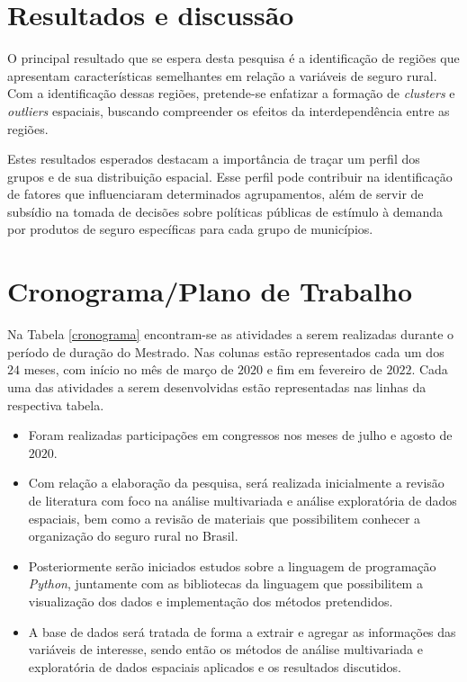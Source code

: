 \documentclass[12pt, a4paper,brazil,oneside]{article}
\begin{document}
	\newpage
	\section{Resultados e discussão} \label{resultadosesperados}
	
	O principal resultado que se espera desta pesquisa é a identificação de regiões que apresentam características semelhantes em relação a variáveis de seguro rural. Com a identificação dessas regiões, pretende-se enfatizar a formação de \textit{clusters} e \textit{outliers} espaciais, buscando compreender os efeitos da interdependência entre as regiões.
	
	Estes resultados esperados destacam a importância de traçar um perfil dos grupos e de sua distribuição espacial. Esse perfil pode contribuir na identificação de fatores que influenciaram determinados agrupamentos, além de servir de subsídio na tomada de decisões sobre políticas públicas de estímulo à demanda por produtos de seguro específicas para cada grupo de municípios.
	
	\newpage
	\section{Cronograma/Plano de Trabalho} \label{seccronograma}
	
	
	Na Tabela \ref{cronograma} encontram-se as atividades a serem realizadas durante o período de duração do Mestrado. Nas colunas estão representados cada um dos $24$ meses, com início no mês de março de $2020$ e fim em fevereiro de $2022$. Cada uma das atividades a serem desenvolvidas estão representadas nas linhas da respectiva tabela.
	
	\begin{itemize}
		
		\item Foram realizadas participações em congressos nos meses de julho e agosto de $2020$.
		
		\item Com relação a elaboração da pesquisa, será realizada inicialmente a revisão de literatura com foco na análise multivariada e análise exploratória de dados espaciais, bem como a revisão de materiais que possibilitem conhecer a organização do seguro rural no Brasil.
		
		\item Posteriormente serão iniciados estudos sobre a linguagem de programação \textit{Python}, juntamente com as bibliotecas da linguagem que possibilitem a visualização dos dados e implementação dos métodos pretendidos.	
		
		\item A base de dados será tratada de forma a extrair e agregar as informações das variáveis de interesse, sendo então os métodos de análise multivariada e exploratória de dados espaciais aplicados e os resultados discutidos.
		
	\end{itemize}
	
\end{document}
